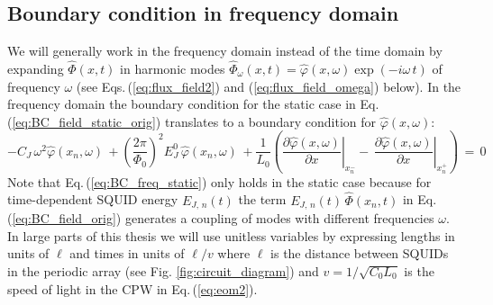 \subsection{Boundary condition in frequency domain}\label{sec:BC_in_frequency_domain}
%
\noindent
We will generally work in the frequency domain instead of the time domain by 
expanding $\hat{\Phi}(x, t)$ in harmonic modes 
$\hat{\Phi}_{\omega}(x, t) = \hat{\varphi}(x,\omega) \exp(- i \omega \, t)$ of frequency $\omega$
(see Eqs.\,(\ref{eq:flux_field2}) and (\ref{eq:flux_field_omega}) below).
In the frequency domain the boundary condition for the static case in Eq.\,(\ref{eq:BC_field_static_orig}) 
translates to a boundary condition for $\hat{\varphi}(x,\omega)$:
%
\begin{equation}\label{eq:BC_freq_static}
- C_{J} \, \omega^2 \hat{\varphi}(x_n, \omega) \, + 
\left(\frac{2 \pi}{\Phi_{0}}\right)^{2} E_J^0 \, \hat{\varphi}(x_n, \omega) \, + 
\frac{1}{L_{0}}\left(\left.\frac{\partial \hat{\varphi}(x, \omega)}{\partial x}\right|_{x_n^{-}}
- \, \left.\frac{\partial \hat{\varphi}(x,\omega)}{\partial x}\right|_{x_n^{+}}\right) \, = \, 0
\end{equation}
%
Note that Eq.\,(\ref{eq:BC_freq_static}) only holds in the static case because 
for time-dependent SQUID energy $E_{J,\,n}(t)$ the term $E_{J,\,n}(t) \, \hat{\Phi}(x_n, t)$ 
in Eq.\,(\ref{eq:BC_field_orig}) generates a coupling of modes with different frequencies $\omega$.
%
In large parts of this thesis we will use unitless variables by expressing lengths in units of $\ell$
and times in units of $\ell/v$ where $\ell$ is the distance between SQUIDs in the periodic array 
(see Fig. \ref{fig:circuit_diagram})
and $v = 1 / \sqrt{C_0 L_0}$ is the speed of light in the CPW in Eq.\,(\ref{eq:eom2}).  
%
